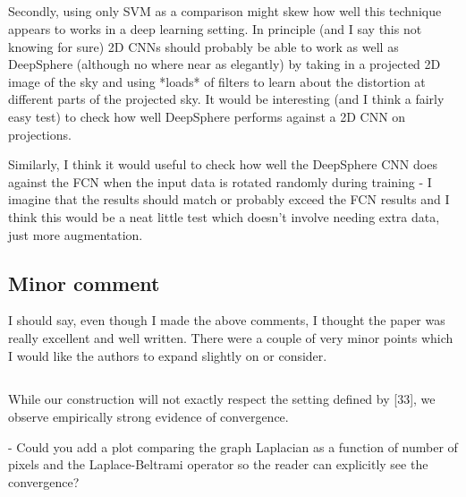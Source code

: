 \documentclass[12pt,a4paper]{article}
\newcommand{\nati}[1]{{\color[rgb]{.1,.6,.1}{NP: #1}}}
\begin{document}
\subsection{}

\begin{mdframed}[style=comment] 
Secondly, using only SVM as a comparison might skew how well this technique appears to works in a deep learning setting. In principle (and I say this not knowing for sure) 2D CNNs should probably be able to work as well as DeepSphere (although no where near as elegantly) by taking in a projected 2D image of the sky and using *loads* of filters to learn about the distortion at different parts of the projected sky. It would be interesting (and I think a fairly easy test) to check how well DeepSphere performs against a 2D CNN on projections. 
\end{mdframed}
\nati{This is something we should be abble to do. Actually, since we used 1/12 of the sphere, all the pixel grids we use are somehow squared. @Tomek, do you know if we can use directly that as a projection? Or do you know how to do the projection? What happen if the traditional 2D CNN is as good as our technique?}

\begin{mdframed}[style=comment] 
Similarly, I think it would useful to check how well the DeepSphere CNN does against the FCN when the input data is rotated randomly during training - I imagine that the results should match or probably exceed the FCN results and I think this would be a neat little test which doesn't involve needing extra data, just more augmentation.
\end{mdframed}
\nati{Problem here is that rotation is not simple on a sphere. So it will be very slow... In theory, I believe that CNN will match FCN. What shall we do?}

\subsection*{Minor comment}

\begin{mdframed}[style=comment] 
I should say, even though I made the above comments, I thought the paper was really excellent and well written. There were a couple of very minor points which I would like the authors to expand slightly on or consider.
\end{mdframed}

\subsection{}
\begin{mdframed}[style=comment] 
While our construction will not exactly respect the setting defined by [33], we observe empirically strong evidence of convergence.

- Could you add a plot comparing the graph Laplacian as a function of number of pixels and the Laplace-Beltrami operator so the reader can explicitly see the convergence?
\end{mdframed}
\end{document}
